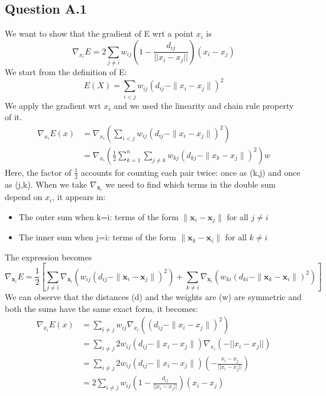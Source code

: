 \documentclass[a4paper]{scrartcl}
\begin{document}
\subsection*{Question A.1}
We want to show that the gradient of E wrt a point $x_i$ is 
\[
\nabla_{x_i} E = 2 \sum_{j\ne i} w_{ij} \left(1-\frac{d_{ij}}{||x_i - x_j||}\right)(x_i-x_j)
\]
We start from the definition of E:
\[
E(X) = \sum_{i<j} w_{ij} \left(d_{ij} - \|x_i - x_j\|\right)^2
\]
We apply the gradient wrt $x_i$ and we used the linearity and chain rule property of it.
\begin{align*}
    \nabla_{x_i} E(x) &= \nabla_{x_i} \left( \sum_{i<j} w_{ij} \left(d_{ij} - \|x_i - x_j\|\right)^2 \right)\\
    &= \nabla_{x_i} \left( \frac{1}{2} \sum_{k=1}^{n} \sum_{j \ne k} w_{kj} \left(d_{kj} - \|x_k - x_j\|\right)^2 \right)w
\end{align*}
Here, the factor of $\frac{1}{2}$ accounts for counting each pair twice: once as (k,j) and once as (j,k).
When we take $\nabla_{\mathbf{x}_i}$ we need to find which terms in the double sum depend on $x_i$, it appears in:
\begin{itemize}
    \item The outer sum when k=i: terms of the form $\|\mathbf{x}_i - \mathbf{x}_j\|$ for all $j \neq i$
    \item The inner sum when j=i: terms of the form $\|\mathbf{x}_k - \mathbf{x}_i\|$ for all $k \neq i$
\end{itemize}
The expression becomes
\[
\nabla_{\mathbf{x}_i} E = \frac{1}{2} \left[ \sum_{j \neq i} \nabla_{\mathbf{x}_i} \left( w_{ij} (d_{ij} - \|\mathbf{x}_i - \mathbf{x}_j\|)^2 \right) + \sum_{k \neq i} \nabla_{\mathbf{x}_i} \left( w_{ki} (d_{ki} - \|\mathbf{x}_k - \mathbf{x}_i\|)^2 \right) \right]
\]
We can observe that the distances (d) and the weights are (w) are symmetric and both the sums have the same exact form, it becomes:
\begin{align*}
    \nabla_{x_i} E(x) &=  \sum_{i \ne j} w_{ij}  \nabla_{x_i} \left( \left(d_{ij} - \|x_i - x_j\|\right)^2 \right)\\
    &= \sum_{i \ne j} 2 w_{ij}  \left(d_{ij} - \|x_i - x_j\|\right) \nabla_{x_i}\left(- ||x_i - x_j||\right)\\
    &= \sum_{i \ne j} 2 w_{ij}  \left(d_{ij} - \|x_i - x_j\|\right) \left(-\frac{x_i - x_j}{||x_i - x_j||}\right)\\
    &= 2 \sum_{i \ne j} w_{ij}  \left(1- \frac{d_{ij}}{||x_i - x_j||} \right)\left(x_i - x_j\right)
\end{align*}
\end{document}
